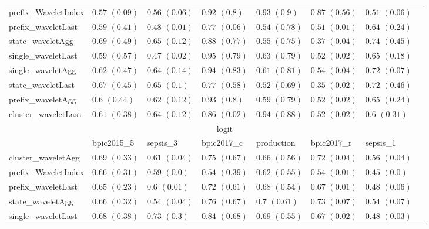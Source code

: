\documentclass[twoside,11pt]{Latex/Classes/PhDthesisPSnPDF}
\begin{document}
\begin{table}[h]
{\begin{tabular}{llllllll}
				prefix\_WaveletIndex & $0.57$ ${(0.09)}$ & $0.56$ ${(0.06)}$ & $0.92$ ${(0.8)}$ & $0.93$ ${(0.9)}$ & $0.87$ ${(0.56)}$ & $0.51$ ${(0.06)}$ \\
				prefix\_waveletLast & $0.59$ ${(0.41)}$ & $0.48$ ${(0.01)}$ & $0.77$ ${(0.06)}$ & $0.54$ ${(0.78)}$ & $0.51$ ${(0.01)}$ & $0.64$ ${(0.24)}$ \\
				state\_waveletAgg & $0.69$ ${(0.49)}$ & $0.65$ ${(0.12)}$ & $0.88$ ${(0.77)}$ & $0.55$ ${(0.75)}$ & $0.37$ ${(0.04)}$ & $0.74$ ${(0.45)}$ \\
				single\_waveletLast & $0.59$ ${(0.57)}$ & $0.47$ ${(0.02)}$ & $0.95$ ${(0.79)}$ & $0.63$ ${(0.79)}$ & $0.52$ ${(0.02)}$ & $0.65$ ${(0.18)}$ \\
				single\_waveletAgg & $0.62$ ${(0.47)}$ & $0.64$ ${(0.14)}$ & $0.94$ ${(0.83)}$ & $0.61$ ${(0.81)}$ & $0.54$ ${(0.04)}$ & $0.72$ ${(0.07)}$ \\
				state\_waveletLast & $0.67$ ${(0.45)}$ & $0.65$ ${(0.1)}$ & $0.77$ ${(0.58)}$ & $0.52$ ${(0.69)}$ & $0.35$ ${(0.02)}$ & $0.72$ ${(0.46)}$ \\
				prefix\_waveletAgg & $0.6$ ${(0.44)}$ & $0.62$ ${(0.12)}$ & $0.93$ ${(0.8)}$ & $0.59$ ${(0.79)}$ & $0.52$ ${(0.02)}$ & $0.65$ ${(0.24)}$ \\
				cluster\_waveletLast & $0.61$ ${(0.38)}$ & $0.64$ ${(0.12)}$ & $0.86$ ${(0.02)}$ & $0.94$ ${(0.88)}$ & $0.52$ ${(0.02)}$ & $0.6$ ${(0.31)}$ \\
				\bottomrule
				\toprule
				& \multicolumn{5}{c}{logit}
				\\
				& bpic2015\_5 & sepsis\_3 & bpic2017\_c & production & bpic2017\_r & sepsis\_1
				\\ \midrule
				cluster\_waveletAgg & $0.69$ ${(0.33)}$ & $0.61$ ${(0.04)}$ & $0.75$ ${(0.67)}$ & $0.66$ ${(0.56)}$ & $0.72$ ${(0.04)}$ & $0.56$ ${(0.04)}$ \\
				prefix\_WaveletIndex & $0.66$ ${(0.31)}$ & $0.59$ ${(0.0)}$ & $0.54$ ${(0.39)}$ & $0.62$ ${(0.55)}$ & $0.54$ ${(0.01)}$ & $0.45$ ${(0.0)}$ \\
				prefix\_waveletLast & $0.65$ ${(0.23)}$ & $0.6$ ${(0.01)}$ & $0.72$ ${(0.61)}$ & $0.68$ ${(0.54)}$ & $0.67$ ${(0.01)}$ & $0.48$ ${(0.06)}$ \\
				state\_waveletAgg & $0.66$ ${(0.32)}$ & $0.54$ ${(0.04)}$ & $0.76$ ${(0.67)}$ & $0.7$ ${(0.61)}$ & $0.73$ ${(0.07)}$ & $0.54$ ${(0.07)}$ \\
				single\_waveletLast & $0.68$ ${(0.38)}$ & $0.73$ ${(0.3)}$ & $\mathbf{0.84}$ $\mathbf{(0.68)}$  & $0.69$ ${(0.55)}$ & $0.67$ ${(0.02)}$ & $0.48$ ${(0.03)}$ \\

\end{tabular}}
\end{table}
\end{document}
